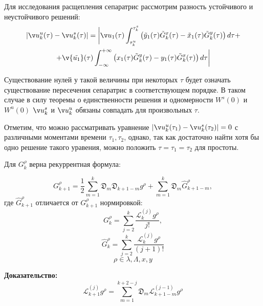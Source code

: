 Для исследования расщепления сепаратрис рассмотрим разность устойчивого и неустойчивого решений:
\begin{multline}
        |\v u_k^u(\tau)-\v u_k^s(\tau)| = \bigg| \v u_1(\tau)\int_{\tau^u_k}^{\tau^s_k} \left( \tilde y_1(\tau) \tilde G_k^x(\tau) - \tilde x_1(\tau) \tilde G_k^y(\tau) \right) d \tau + \\
        +\v{ \tilde{u_1}}(\tau) \int_{-\infty}^{+\infty} \left( x_1(\tau) \tilde G_k^y(\tau) - y_1(\tau) \tilde G_k^x(\tau) \right) d \tau \bigg|
\label{rasshep}
\end{multline}

Существование нулей у такой величины при некоторых $\tau$ будет означать существование пересечения сепаратрис в соответствующем порядке. В таком случае в силу теоремы о единственности решения и одномерности $W^s(0)$ и $W^u(0)$ $\v u_k^s$ и $\v u_k^u$ обязаны совпадать для произвольных $\tau$.

Отметим, что можно рассматривать уравнение $|\v u_k^u(\tau_1)-\v u_k^s(\tau_2)|=0$ с различными моментами времени $\tau_1, \tau_2$, однако, так как достаточно найти хотя бы одно решение такого уравения, можно положить $\tau=\tau_1=\tau_2$ для простоты.


\begin{utv}

Для $G_k^\rho$ верна рекуррентная формула:

\begin{equation*}
G_{k+1}^\rho = \frac12 \sum_{m=1}^k \mathfrak{D}_m \mathfrak{D}_{k+1-m} g^\rho + \sum_{m=1}^k \mathfrak{D}_m \hat G_{k+1-m}^\rho,
\end{equation*}
где $\hat G_{k+1}^\rho$ отличается от $G_{k+1}^\rho$ нормировкой:
$$G_k^\rho = \sum_{j=2}^{k} \frac{\mathcal{L}_k^{(j)} g^\rho }{j!},$$
$$\hat G_k^\rho = \sum_{j=2}^{k} \frac{\mathcal{L}_k^{(j)} g^\rho }{(j+1)!}$$
$$\rho \in {\lambda, \Lambda, x, y}$$
\end{utv}
\textbf{Доказательство:}\nopagebreak[4]
$$\mathcal{L}_{k+1}^{(j)}g^\rho = \sum_{m=1}^{k+2-j} \mathfrak{D}_m \mathcal{L}_{k+1-m}^{(j-1)} g^\rho$$

